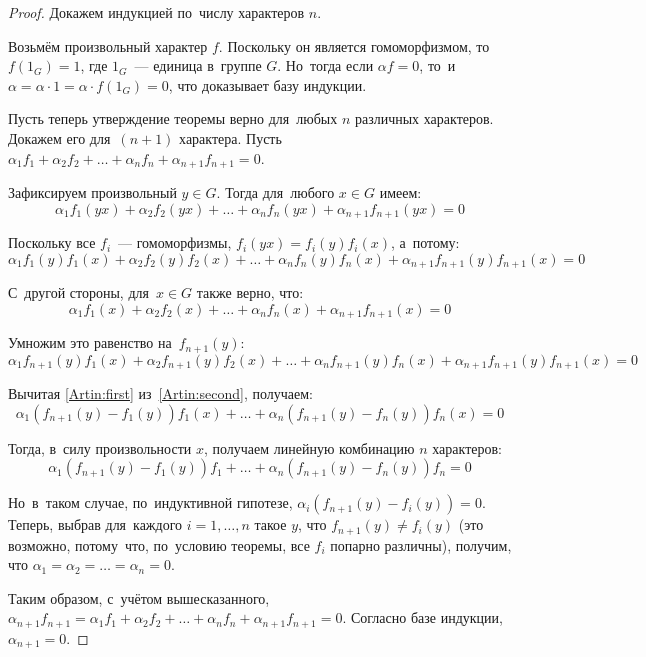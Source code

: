 \documentclass{article}
\begin{document}
\begin{proof}

Докажем индукцией по~числу характеров $n$.

Возьмём произвольный характер $f$. Поскольку он является гомоморфизмом,
то~$f(1_G) = 1$, где $1_G$~— единица в~группе $G$. Но~тогда если $\alpha f = 0$,
то~и~$\alpha = \alpha \cdot 1 = \alpha \cdot f(1_G) = 0$, что доказывает базу индукции.

Пусть теперь утверждение теоремы верно для~любых $n$ различных характеров. Докажем его для~$(n + 1)$ характера.
Пусть $\alpha_1 f_1 + \alpha_2 f_2 + \ldots + \alpha_n f_n + \alpha_{n + 1} f_{n + 1} = 0$.

Зафиксируем произвольный $y \in G$. Тогда для~любого $x \in G$ имеем:
\begin{equation}\label{Artin:first}
    \alpha_1 f_1(yx) + \alpha_2 f_2(yx) + \ldots + \alpha_n f_n(yx) + \alpha_{n + 1} f_{n + 1}(yx) = 0
\end{equation}

Поскольку все $f_i$~— гомоморфизмы, $f_i(yx) = f_i(y) f_i(x)$, а~потому:
$$
    \alpha_1 f_1(y) f_1(x) + \alpha_2 f_2(y) f_2(x) + \ldots + \alpha_n f_n(y) f_n(x) + \alpha_{n + 1} f_{n + 1}(y) f_{n + 1}(x) = 0
$$

С~другой стороны, для~$x \in G$ также верно, что:
$$
    \alpha_1 f_1(x) + \alpha_2 f_2(x) + \ldots + \alpha_n f_n(x) + \alpha_{n + 1} f_{n + 1}(x) = 0
$$

Умножим это равенство на~$f_{n + 1}(y)$:
\begin{equation}\label{Artin:second}
    \alpha_1 f_{n + 1}(y) f_1(x) + \alpha_2 f_{n + 1}(y) f_2(x) + \ldots + \alpha_n f_{n + 1}(y) f_n(x) + \alpha_{n + 1} f_{n + 1}(y) f_{n + 1}(x) = 0
\end{equation}

Вычитая \eqref{Artin:first} из~\eqref{Artin:second}, получаем:
$$
    \alpha_1 (f_{n + 1}(y) - f_1(y)) f_1(x) + \ldots + \alpha_n (f_{n + 1}(y) - f_n(y)) f_n(x) = 0
$$

Тогда, в~силу произвольности $x$, получаем линейную комбинацию $n$ характеров:
$$
    \alpha_1 (f_{n + 1}(y) - f_1(y)) f_1 + \ldots + \alpha_n (f_{n + 1}(y) - f_n(y)) f_n = 0
$$

Но~в~таком случае, по~индуктивной гипотезе, $\alpha_i (f_{n + 1}(y) - f_i(y)) = 0$.
Теперь, выбрав для~каждого $i = 1, \ldots, n$ такое $y$, что $f_{n + 1}(y) \neq f_i(y)$
(это возможно, потому~что, по~условию теоремы, все $f_i$ попарно различны), получим,
что $\alpha_1 = \alpha_2 = \ldots = \alpha_n = 0$.

Таким образом, с~учётом вышесказанного, $\alpha_{n + 1} f_{n + 1} = \alpha_1 f_1 + \alpha_2 f_2 + \ldots + \alpha_n f_n + \alpha_{n + 1} f_{n + 1} = 0$.
Согласно базе индукции, $\alpha_{n + 1} = 0$.

\end{proof}
\end{document}

